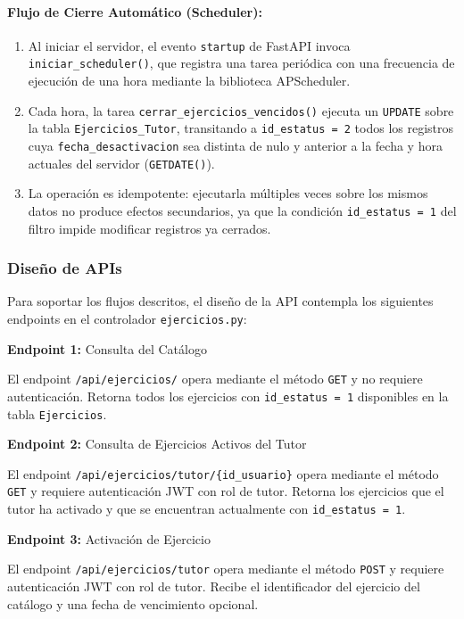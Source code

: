 \paragraph{Flujo de Cierre Automático (Scheduler):}
\begin{enumerate}
    \item Al iniciar el servidor, el evento \texttt{startup} de FastAPI
    invoca \texttt{iniciar\_scheduler()}, que registra una tarea periódica
    con una frecuencia de ejecución de una hora mediante la biblioteca
    APScheduler.
    \item Cada hora, la tarea \texttt{cerrar\_ejercicios\_vencidos()}
    ejecuta un \texttt{UPDATE} sobre la tabla \texttt{Ejercicios\_Tutor},
    transitando a \texttt{id\_estatus = 2} todos los registros cuya
    \texttt{fecha\_desactivacion} sea distinta de nulo y anterior a la
    fecha y hora actuales del servidor (\texttt{GETDATE()}).
    \item La operación es idempotente: ejecutarla múltiples veces sobre
    los mismos datos no produce efectos secundarios, ya que la condición
    \texttt{id\_estatus = 1} del filtro impide modificar registros ya
    cerrados.
\end{enumerate}

\subsubsection{Diseño de APIs}

Para soportar los flujos descritos, el diseño de la API contempla los
siguientes endpoints en el controlador \texttt{ejercicios.py}:

\textbf{Endpoint 1:} Consulta del Catálogo

El endpoint \texttt{/api/ejercicios/} opera mediante el método \texttt{GET}
y no requiere autenticación. Retorna todos los ejercicios con
\texttt{id\_estatus = 1} disponibles en la tabla \texttt{Ejercicios}.

\textbf{Endpoint 2:} Consulta de Ejercicios Activos del Tutor

El endpoint \texttt{/api/ejercicios/tutor/\{id\_usuario\}} opera mediante
el método \texttt{GET} y requiere autenticación JWT con rol de tutor.
Retorna los ejercicios que el tutor ha activado y que se encuentran
actualmente con \texttt{id\_estatus = 1}.

\textbf{Endpoint 3:} Activación de Ejercicio

El endpoint \texttt{/api/ejercicios/tutor} opera mediante el método
\texttt{POST} y requiere autenticación JWT con rol de tutor. Recibe el
identificador del ejercicio del catálogo y una fecha de vencimiento
opcional.

